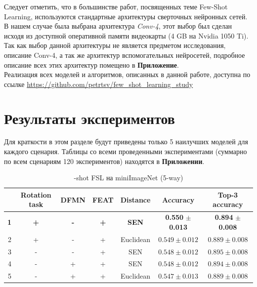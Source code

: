 \documentclass[a4paper, 12pt]{report}
\begin{document}
Следует отметить, что в большинстве работ, посвященных теме Few-Shot Learning, используются стандартные архитектуры сверточных нейронных сетей. В нашем случае была выбрана архитектура \textit{Conv-4}, этот выбор был сделан исходя из доступной оперативной памяти видеокарты (4 GB на Nvidia 1050 Ti). Так как выбор данной архитектуры не является предметом исследования, описание Conv-4, а так же архитектур вспомогательных нейросетей, подробное описание всех этих архитектур помещено в \textbf{Приложение}. \\

Реализация всех моделей и алгоритмов, описанных в данной работе, доступна по ссылке \url{https://github.com/petrtsv/few_shot_learning_study}

\chapter{Результаты экспериментов}

Для краткости в этом разделе будут приведены только 5 наилучших моделей для каждого сценария. Таблицы со всеми проведенными экспериментами (суммарно по всем сценариям 120 экспериментов) находятся в  \textbf{Приложении}.

\begin{table}[H]
\begin{adjustbox}{center}
\begin{tabular}{| r | c c c c | c |  c | }
\hline
    & Rotation task   & DFMN   & FEAT   & Distance         & Accuracy         & Top-3 accuracy   \\
\hline
  \textbf{1} & \textbf{+} & \textbf{-} & \textbf{+} & \textbf{SEN} & \textbf{0.550} $\pm$ \textbf{0.013} & \textbf{0.894} $\pm$ \textbf{0.008} \\
\hline
  2 & +               & -      & +      & Euclidean        & $0.549 \pm 0.012$ & $0.889 \pm 0.008$ \\
\hline
  3 & -               & -      & +      & SEN              & $0.548 \pm 0.012$ & $0.895 \pm 0.008$ \\
\hline
  4 & -               & +      & +      & SEN              & $0.548 \pm 0.012$ & $0.894 \pm 0.008$ \\
\hline
  5 & -               & +      & +      & Euclidean        & $0.547 \pm 0.013$ & $0.889 \pm 0.008$ \\
\hline
\end{tabular}
\end{adjustbox}
	\caption{-shot FSL на miniImageNet (5-way)}
\end{table}
\end{document}
